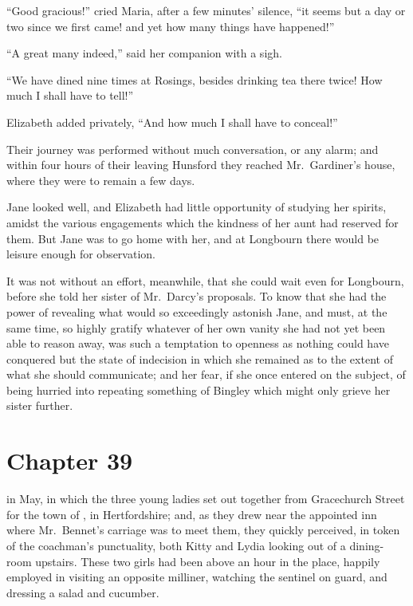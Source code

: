 ``Good gracious!'' cried Maria, after a few minutes' silence, ``it
seems but a day or two since we first came! and yet how many
things have happened!''

``A great many indeed,'' said her companion with a sigh.

``We have dined nine times at Rosings, besides drinking tea there
twice!  How much I shall have to tell!''

Elizabeth added privately, ``And how much I shall have to conceal!''

Their journey was performed without much conversation, or any
alarm; and within four hours of their leaving Hunsford they
reached Mr.\ Gardiner's house, where they were to remain a few
days.

Jane looked well, and Elizabeth had little opportunity of
studying her spirits, amidst the various engagements which the
kindness of her aunt had reserved for them.  But Jane was to go
home with her, and at Longbourn there would be leisure enough
for observation.

It was not without an effort, meanwhile, that she could wait
even for Longbourn, before she told her sister of Mr.\ Darcy's
proposals.  To know that she had the power of revealing what
would so exceedingly astonish Jane, and must, at the same time,
so highly gratify whatever of her own vanity she had not yet
been able to reason away, was such a temptation to openness
as nothing could have conquered but the state of indecision
in which she remained as to the extent of what she should
communicate; and her fear, if she once entered on the subject,
of being hurried into repeating something of Bingley which
might only grieve her sister further.



\chapter{Chapter 39}


 in May, in which the three young ladies
set out together from Gracechurch Street for the town of \gdash{},
in Hertfordshire; and, as they drew near the appointed inn where
Mr.\ Bennet's carriage was to meet them, they quickly perceived,
in token of the coachman's punctuality, both Kitty and Lydia
looking out of a dining-room upstairs.  These two girls had been
above an hour in the place, happily employed in visiting an
opposite milliner, watching the sentinel on guard, and dressing a
salad and cucumber.

